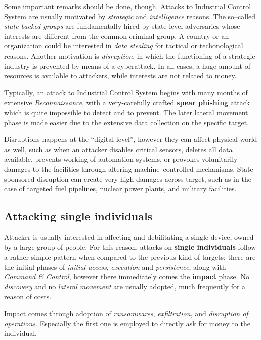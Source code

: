 \documentclass[10pt]{extreport}
\begin{document}
Some important remarks should be done, though. Attacks to Industrial Control
System are usually motivated by \emph{strategic} and \emph{intelligence}
reasons. The so--called \emph{state\--backed groups} are fundamentally hired
by state\--level adversaries whose interests are different from the common
criminal group. A country or an organization could be interested in \emph{data
stealing} for tactical or techonological reasons. Another motivation is
\emph{disruption}, in which the functioning of a strategic industry is
prevented by means of a cyberattack. In all cases, a huge amount of resources
is available to attackers, while interests are not related to money.

Typically, an attack to Industrial Control System begins with many months of
extensive \emph{Reconnaissance}, with a very\--carefully crafted \textbf{spear
phishing} attack which is quite impossible to detect and to prevent. The later
lateral movement phase is made easier due to the extensive data collection on
the specific target.

Disruptions happens at the ``digital level'', however they can affect physical
world as well, such as when an attacker disables critical sensors, deletes all
data available, prevents working of automation systems, or provokes
volunitarily damages to the facilities through altering machine--controlled
mechanisms. State--sponsored disruption can create very high damages across
target, such as in the case of targeted fuel pipelines, nuclear power plants,
and military facilities.


\subsection{Attacking single individuals}

Attacker is usually interested in affecting and debilitating a single device,
owned by a large group of people. For this reason, attacks on \textbf{single
individuals} follow a rather simple pattern when compared to the previous kind
of targets: there are the initial phases of \emph{initial access},
\emph{execution} and \emph{persistence}, along with \emph{Command \& Control},
however there immediately comes the \textbf{impact} phase. No \emph{discovery}
and no \emph{lateral movement} are usually adopted, much frequently for a
reason of costs.

Impact comes through adoption of \emph{ransomwares}, \emph{exfiltration}, and
\emph{disruption of operations}. Especially the first one is employed to
directly ask for money to the individual.
\end{document}
